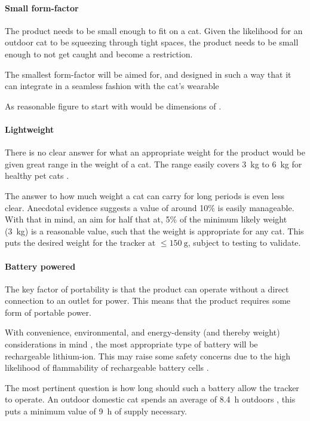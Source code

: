 \paragraph{Small form-factor}
The product needs to be small enough to fit on a cat. Given the likelihood for 
an outdoor cat to be squeezing through tight spaces, the product needs to be small 
enough to not get caught and become a restriction. 

The smallest form-factor will be aimed for, and designed in such a way 
that it can integrate in a seamless fashion with the cat's wearable 

As reasonable figure to start with would be dimensions of 
.

\paragraph{Lightweight}
There is no clear answer for what an appropriate weight for the product 
would be given great range in the weight of a cat. The range easily covers
\qty{3}{\kg} to \qty{6}{\kg} for healthy pet cats \cite{kienzle:pilot}.

The answer to how much weight a cat can carry for long periods is even 
less clear. Anecdotal evidence suggests a value of around 10\%
is easily manageable. With that in mind, an aim for 
half that at, 5\% of the minimum likely weight (\qty{3}{\kg})
is a reasonable value, such that the weight is appropriate for any cat.
This puts the desired weight for the tracker at $\leq \qty{150}{\g}$, 
subject to testing to validate.

\paragraph{Battery powered}
\label{sec:specsbatt}
The key factor of portability is that the product can operate 
without a direct connection to an outlet for power. 
This means that the product requires some form of portable power.

With convenience, environmental, and energy-density (and thereby weight) considerations in mind \cite{blomgren:lithium},
the most appropriate type of battery will be rechargeable lithium-ion. This may raise some safety concerns 
due to the high likelihood of flammability of rechargeable battery cells \cite{chen:flammable}.

The most pertinent question is how long should such a battery allow the tracker to operate.
An outdoor domestic cat spends an average of \qty{8.4}{\hour} outdoors \cite{Bischof2022},
this puts a minimum value of \qty{9}{\hour} of supply necessary. 

